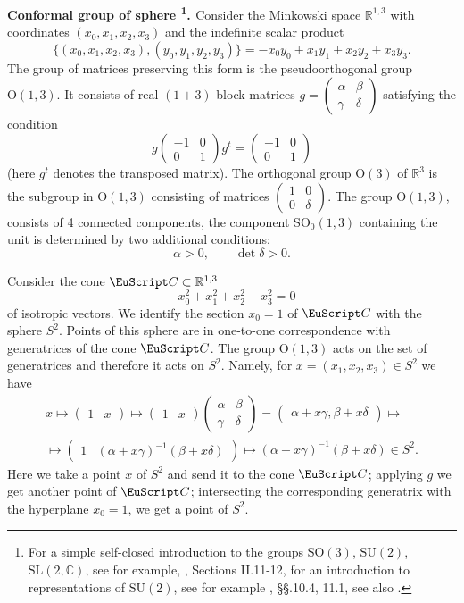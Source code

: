 \documentclass[]{amsart}
\newcounter{sec}
\newcounter{punct}[sec]
\def\punct{\refstepcounter{punct}{\arabic{sec}.\arabic{punct}.  }}
\def\SL{\mathrm {SL}}
\def\SU{\mathrm {SU}}
\def\SO{\mathrm  {SO}}
\renewcommand\O{\mathrm{O}}
\def\cC{\EuScript C}
\def\R {{\mathbb R }}
\def\C {{\mathbb C }}
\def\ov{\overline}
\def\wt{\widetilde}
\def\sm{\smallskip}
\def\0{{\ov 0}}
\begin{document}
\sm

{\bf\punct Conformal group of sphere%
\footnote{For a simple self-closed introduction
 to the groups $\SO(3)$, $\SU(2)$,
 $\SL(2,\C)$,
see for example, \cite{KM}, Sections II.11-12, for an introduction to representations of
$\SU(2)$, see for example \cite{FH}, \S\S.10.4, 11.1, see also \cite{GMS}.}.%
\label{ss:conformal-sphere}}
 Consider the Minkowski space $\R^{1,3}$
 with coordinates $(x_0,x_1,x_2,x_3)$ and the indefinite scalar product
$$
\bigl\{ (x_0,x_1,x_2,x_3),(y_0,y_1,y_2,y_3)\bigr\}
=-x_0y_0+x_1y_1+x_2y_2+x_3y_3.
$$
The group of matrices preserving this form is the pseudoorthogonal 
group $\O(1,3)$. It consists of real $(1+3)$-block matrices 
$g=\begin{pmatrix}\alpha&\beta\\\gamma&\delta\end{pmatrix}$ satisfying the condition
$$
g\begin{pmatrix}-1&0\\0&1\end{pmatrix} g^t=\begin{pmatrix}-1&0\\0&1\end{pmatrix}
$$
(here $g^t$ denotes the transposed matrix). The orthogonal group
$\O(3)$ of $\R^3$ is the subgroup in $\O(1,3)$ consisting of matrices
$\begin{pmatrix}1&0\\0&\delta\end{pmatrix}$.
The group $\O(1,3)$, consists of 4  connected components,
 the component $\SO_0(1,3)$ containing the unit is
  determined by two additional conditions:
$$
\alpha>0, \qquad \det \delta>0.
$$

Consider the cone $\cC\subset \R^{1,3}$  
$$
-x_0^2+x_1^2+x_2^2+x_3^2=0
$$
 of isotropic vectors. We identify the section $x_0=1$ of $\cC$
with the sphere $S^2$. Points of this sphere are in one-to-one correspondence
with generatrices of the cone $\cC$.
The group $\O(1,3)$ acts on the set of generatrices and therefore
it acts on $S^2$. Namely, for $x=(x_1,x_2,x_3)\in S^2$
we have
\begin{multline*}
x\mapsto \begin{pmatrix}1&x\end{pmatrix}
\mapsto
 \begin{pmatrix}1&x\end{pmatrix} \begin{pmatrix}\alpha&\beta\\\gamma&\delta\end{pmatrix}
=\begin{pmatrix}\alpha+x\gamma,\beta+x\delta\end{pmatrix}\mapsto
\\
\mapsto 
\begin{pmatrix}1&(\alpha+x\gamma)^{-1}(\beta+x\delta)\end{pmatrix}\mapsto (\alpha+x\gamma)^{-1}(\beta+x\delta)\in S^2.
\end{multline*}
Here we take a point $x$ of $S^2$ and send it to the cone $\cC$;
applying $g$ we get another point   of $\cC$;
intersecting the corresponding generatrix with the hyperplane
$x_0=1$, we get a point of $S^2$.
 
\end{document}
